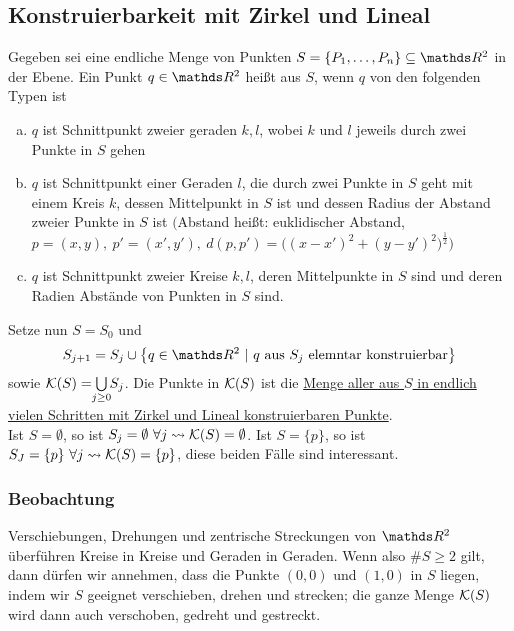 \subsection{Konstruierbarkeit mit Zirkel und Lineal}
\label{sub:zirkel_lineal}
Gegeben sei eine endliche Menge von Punkten $S=\penbrace{P_1\dt{,}P_n}\subseteq \R^2$ in der Ebene.
Ein Punkt $q\in\R^2$ heißt  aus $S$, wenn $q$ von den folgenden Typen ist
\begin{enumerate}[(a)]
	\item $q$ ist Schnittpunkt zweier geraden $k,l$, wobei $k$ und $l$ jeweils durch zwei Punkte in $S$ gehen
	\item $q$ ist Schnittpunkt einer Geraden $l$, die durch zwei Punkte in $S$ geht mit einem Kreis $k$, dessen Mittelpunkt in $S$ ist und dessen Radius der Abstand zweier Punkte in $S$ ist $\bigg($Abstand heißt: euklidischer Abstand, $p=(x,y),~p'=(x',y'),~d(p,p')=\big((x-x')^2+(y-y')^2\big)^{\frac{1}{2}}\bigg)$
	\item $q$ ist Schnittpunkt zweier Kreise $k,l$, deren Mittelpunkte in $S$ sind und deren Radien Abstände von Punkten in $S$ sind.
\end{enumerate} 
Setze nun $S=S_0$ und
\[
S_{j+1}=S_j\cup \penbrace{q\in \R^2~|~q \text{ aus }S_j \text{ elemntar konstruierbar}}
\]
sowie $\mc{K}(S)=\bigcup\ablim{j\ge 0}S_j$.
Die Punkte in $\mathcal{K}(S)$ ist die \uline{Menge aller aus $S$ in endlich vielen Schritten mit Zirkel und Lineal konstruierbaren Punkte}.\\
Ist $S=\emptyset$, so ist $S_j=\emptyset~\forall j\rightsquigarrow \mathcal{K}(S)=\emptyset$.
Ist $S=\{p\}$, so ist $S_J=\{p\}~\forall j\rightsquigarrow \mathcal{K}(S)=\{p\}$, diese beiden Fälle sind interessant.

\subsubsection*{Beobachtung}
Verschiebungen, Drehungen und zentrische Streckungen von $\R^2$ überführen Kreise in Kreise und Geraden in Geraden.
Wenn also $\#S\ge 2$ gilt, dann dürfen wir annehmen, dass die Punkte $(0,0)$ und $(1,0)$ in $S$ liegen, indem wir $S$ geeignet verschieben, drehen und strecken; die ganze Menge $\mathcal{K}(S)$ wird dann auch verschoben, gedreht und gestreckt.

